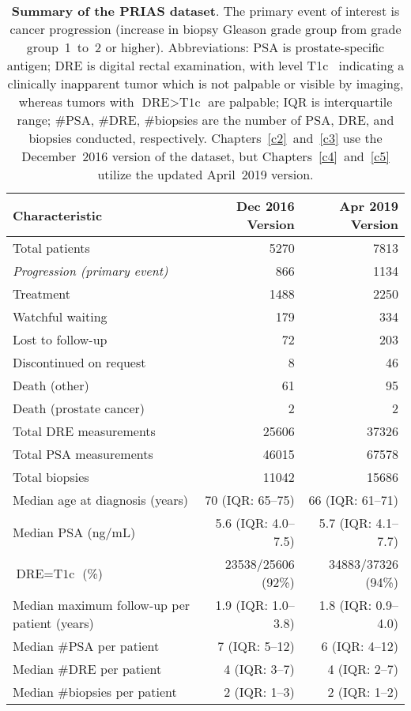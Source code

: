 \begin{table}
\small
\centering
\caption{\textbf{Summary of the PRIAS dataset}. The primary event of interest is cancer progression (increase in biopsy Gleason grade group from grade group~1~to~2 or higher). Abbreviations: PSA is prostate-specific antigen; DRE is digital rectal examination, with level T1c~\citep{schroder1992tnm} indicating a clinically inapparent tumor which is not palpable or visible by imaging, whereas tumors with $\mbox{DRE} > \mbox{T1c}$ are palpable; IQR is interquartile range; \#PSA, \#DRE, \#biopsies are the number of PSA, DRE, and biopsies conducted, respectively. Chapters~\ref{c2}~and~\ref{c3} use the December~2016 version of the dataset, but Chapters~\ref{c4}~and~\ref{c5} utilize the updated April~2019 version.}
\label{c1:table:1}
\begin{tabular}{p{5cm}rr}
\toprule
\textbf{Characteristic} & \textbf{Dec 2016 Version} & \textbf{Apr 2019 Version}\\
\midrule
Total patients & 5270 & 7813\\
\emph{Progression (primary event)}  & 866 & 1134\\
Treatment  & 1488 & 2250\\
Watchful waiting  &  179 & 334\\
Lost to follow-up  & 72 & 203\\
Discontinued on request   & 8 & 46\\
Death (other)  & 61 & 95\\
Death (prostate cancer)  & 2 & 2\\
\midrule
Total DRE measurements & 25606 & 37326 \\
Total PSA measurements  & 46015 & 67578\\
Total biopsies  & 11042 & 15686\\
Median age at diagnosis (years)  & 70 (IQR: 65--75) & 66 (IQR: 61--71)\\
Median PSA (ng/mL)  & 5.6 (IQR: 4.0--7.5) & 5.7 (IQR: 4.1--7.7)\\
$\mbox{DRE} = \mbox{T1c}$ (\%) & 23538/25606 (92\%) & 34883/37326 (94\%) \\
\midrule
Median maximum follow-up per patient (years)  & 1.9 (IQR: 1.0--3.8) &  1.8 (IQR: 0.9--4.0)\\
Median \#PSA per patient  & 7 (IQR: 5--12) &  6 (IQR: 4--12)\\
Median \#DRE per patient & 4 (IQR: 3--7) & 4 (IQR: 2--7)\\
Median \#biopsies per patient  & 2 (IQR: 1--3) &  2 (IQR: 1--2)\\
\bottomrule
\end{tabular}
\end{table}

